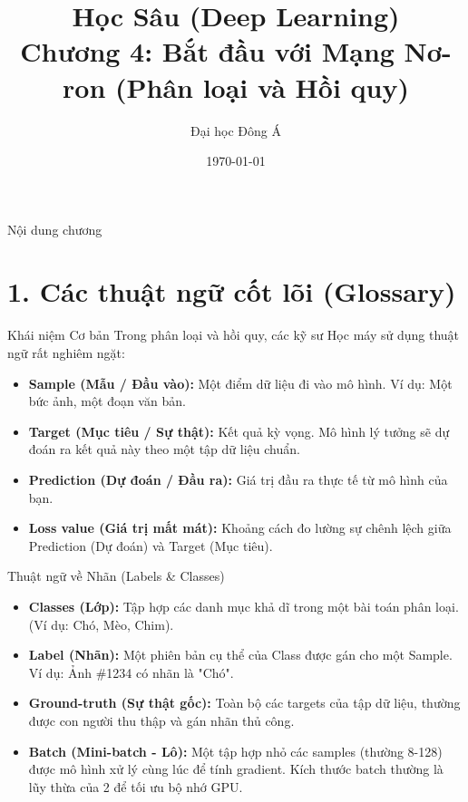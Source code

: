 \documentclass[aspectratio=169]{beamer}
\title[Chương 4: Phân loại \& Hồi quy]{Học Sâu (Deep Learning) \\ \vspace{0.5cm} \Large Chương 4: Bắt đầu với Mạng Nơ-ron (Phân loại và Hồi quy)}
\author{Đại học Đông Á}
\date{\today}
\begin{document}
\begin{frame}
    \titlepage
\end{frame}

\begin{frame}{Nội dung chương}
    \tableofcontents
\end{frame}

\section{1. Các thuật ngữ cốt lõi (Glossary)}

\begin{frame}{Khái niệm Cơ bản}
    Trong phân loại và hồi quy, các kỹ sư Học máy sử dụng thuật ngữ rất nghiêm ngặt:
    \begin{itemize}
        \item \textbf{Sample (Mẫu / Đầu vào):} Một điểm dữ liệu đi vào mô hình. Ví dụ: Một bức ảnh, một đoạn văn bản.
        \item \textbf{Target (Mục tiêu / Sự thật):} Kết quả kỳ vọng. Mô hình lý tưởng sẽ dự đoán ra kết quả này theo một tập dữ liệu chuẩn.
        \item \textbf{Prediction (Dự đoán / Đầu ra):} Giá trị đầu ra thực tế từ mô hình của bạn.
        \item \textbf{Loss value (Giá trị mất mát):} Khoảng cách đo lường sự chênh lệch giữa Prediction (Dự đoán) và Target (Mục tiêu).
    \end{itemize}
\end{frame}

\begin{frame}{Thuật ngữ về Nhãn (Labels \& Classes)}
    \begin{itemize}
        \item \textbf{Classes (Lớp):} Tập hợp các danh mục khả dĩ trong một bài toán phân loại. (Ví dụ: Chó, Mèo, Chim).
        \item \textbf{Label (Nhãn):} Một phiên bản cụ thể của Class được gán cho một Sample. Ví dụ: Ảnh \#1234 có nhãn là "Chó".
        \item \textbf{Ground-truth (Sự thật gốc):} Toàn bộ các targets của tập dữ liệu, thường được con người thu thập và gán nhãn thủ công.
        \item \textbf{Batch (Mini-batch - Lô):} Một tập hợp nhỏ các samples (thường 8-128) được mô hình xử lý cùng lúc để tính gradient. Kích thước batch thường là lũy thừa của 2 để tối ưu bộ nhớ GPU.
    \end{itemize}
\end{frame}
\end{document}
